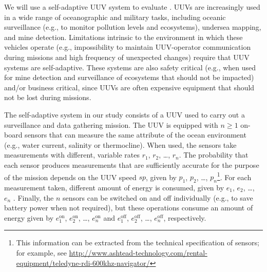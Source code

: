 
We will use a self-adaptive UUV system to evaluate \approach. UUVs are increasingly used in a wide range of oceanographic and military tasks, including oceanic surveillance (e.g., to monitor pollution levels and ecosystems), undersea mapping, and mine detection. Limitations intrinsic to the environment in which these vehicles operate (e.g., impossibility  to maintain UUV-operator communication during missions and high frequency of unexpected changes) require that UUV systems are self-adaptive. These systems are also safety critical (e.g., when used for mine detection and surveillance of ecosystems that should not be impacted) and/or business critical, since UUVs are often expensive equipment that should not be lost during missions.

The self-adaptive system in our study consists of a UUV used to carry out a surveillance and data gathering mission. The UUV is equipped with $n \geq 1$ on-board sensors that can measure the same attribute of the ocean environment (e.g., water current, salinity or thermocline). When used, the sensors take measurements with different, variable rates $r_1$, $r_2$, \ldots, $r_n$. The probability that each sensor produces measurements that are sufficiently accurate for the purpose of the mission depends on the UUV speed $sp$, given by  $p_1$, $p_2$, \ldots, $p_n$\footnote{This information can be extracted from the technical specification of sensors; for example, see \url{http://www.ashtead-technology.com/rental-equipment/teledyne-rdi-600khz-navigator/}}. For each measurement taken, different amount of energy is consumed, given by $e_1$, $e_2$, \ldots, $e_n$ . %
Finally, the $n$ sensors can be switched on and off individually (e.g., to save battery power when not required), but these operations consume an amount of energy given by $e^\mathrm{on}_1$, $e^\mathrm{on}_2$, \ldots, $e^\mathrm{on}_n$ and $e^\mathrm{off}_1$, $e^\mathrm{off}_2$, \ldots, $e^\mathrm{off}_n$, respectively.

